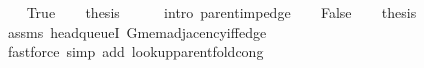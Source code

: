\begin{isabellebody}
\ \ \isamarkupfalse%
\ True\isanewline
\ \ \isamarkupfalse%
\ {\isacharquery}{\kern0pt}thesis\isanewline
\ \ \ \ \isamarkupfalse%
\ {\isacharparenleft}{\kern0pt}intro\ parent{\isacharunderscore}{\kern0pt}imp{\isacharunderscore}{\kern0pt}edge{\isacharparenright}{\kern0pt}\isanewline
{}\isamarkupfalse%
\isanewline
\ \ \isamarkupfalse%
\ False\isanewline
\ \ \isamarkupfalse%
\ {\isacharquery}{\kern0pt}thesis\isanewline
\ \ \ \ \isamarkupfalse%
\ assms\ head{\isacharunderscore}{\kern0pt}queueI\ G{\isachardot}{\kern0pt}mem{\isacharunderscore}{\kern0pt}adjacency{\isacharunderscore}{\kern0pt}iff{\isacharunderscore}{\kern0pt}edge\isanewline
\ \ \ \ \isamarkupfalse%
\ {\isacharparenleft}{\kern0pt}fastforce\ simp\ add{\isacharcolon}{\kern0pt}\ lookup{\isacharunderscore}{\kern0pt}parent{\isacharunderscore}{\kern0pt}fold{\isacharunderscore}{\kern0pt}cong{\isacharparenright}{\kern0pt}\isanewline
{}\isamarkupfalse%
%
\endisatagproof
{\isafoldproof}%
%
\isadelimproof
%
\endisadelimproof
%
\begin{isamarkuptext}%

\end{isamarkuptext}
\end{isabellebody}
